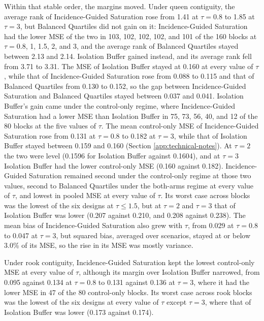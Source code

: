 \documentclass[11pt]{article}
\begin{document}
Within that stable order, the margins moved. Under queen contiguity, the
average rank of Incidence-Guided Saturation rose from 1.41 at
\(\tau = 0.8\) to 1.85 at \(\tau = 3\), but Balanced Quartiles did not
gain on it: Incidence-Guided Saturation had the lower MSE of
the two in 103, 102, 102, 102, and 101 of the 160 blocks at
\(\tau = 0.8\), 1, 1.5, 2, and 3, and the average rank of Balanced
Quartiles stayed between 2.13 and 2.14. Isolation Buffer gained instead,
and its average rank fell from 3.71 to 3.31. The MSE of Isolation Buffer
stayed at 0.160 at every value of \(\tau\), while that of
Incidence-Guided Saturation rose from 0.088 to 0.115 and that
of Balanced Quartiles from 0.130 to 0.152, so the gap between
Incidence-Guided Saturation and Balanced Quartiles stayed
between 0.037 and 0.041. Isolation Buffer's gain came under the
control-only regime, where Incidence-Guided Saturation had a
lower MSE than Isolation Buffer in 75, 73, 56, 40, and 12 of the 80
blocks at the five values of \(\tau\). The mean control-only MSE of
Incidence-Guided Saturation rose from 0.131 at \(\tau = 0.8\)
to 0.182 at \(\tau = 3\), while that of Isolation Buffer stayed between
0.159 and 0.160 (Section \ref{app:technical-notes}). At \(\tau = 2\) the
two were level (0.1596 for Isolation Buffer against 0.1604), and at
\(\tau = 3\) Isolation Buffer had the lower control-only MSE (0.160
against 0.182). Incidence-Guided Saturation remained second
under the control-only regime at those two values, second to Balanced
Quartiles under the both-arms regime at every value of \(\tau\), and
lowest in pooled MSE at every value of \(\tau\). Its worst case across
blocks was the lowest of the six designs at \(\tau \le 1.5\), but at
\(\tau = 2\) and \(\tau = 3\) that of Isolation Buffer was lower (0.207
against 0.210, and 0.208 against 0.238). The mean bias of
Incidence-Guided Saturation also grew with \(\tau\), from
0.029 at \(\tau = 0.8\) to 0.047 at \(\tau = 3\), but squared bias,
averaged over scenarios, stayed at or below 3.0\% of its MSE, so the
rise in its MSE was mostly variance.

Under rook contiguity, Incidence-Guided Saturation kept the
lowest control-only MSE at every value of \(\tau\), although its margin
over Isolation Buffer narrowed, from 0.095 against 0.134 at
\(\tau = 0.8\) to 0.131 against 0.136 at \(\tau = 3\), where it had the
lower MSE in 47 of the 80 control-only blocks. Its worst case across
rook blocks was the lowest of the six designs at every value of \(\tau\)
except \(\tau = 3\), where that of Isolation Buffer was lower (0.173
against 0.174).
\end{document}
